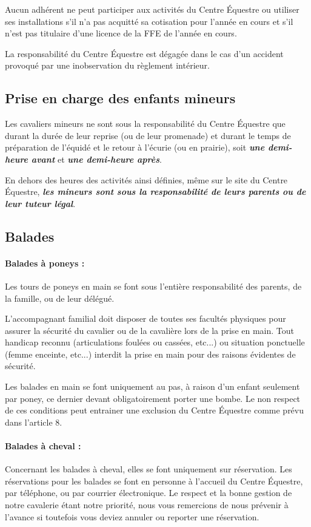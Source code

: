 \documentclass[11pt,a4paper]{article}
\begin{document}
Aucun adhérent ne peut participer aux activités du Centre Équestre ou utiliser ses installations s'il n'a pas acquitté sa cotisation pour l'année en cours et s'il n'est pas titulaire d'une licence de la FFE de l'année en cours.

La responsabilité du Centre Équestre est dégagée dans le cas d'un accident provoqué par une inobservation du règlement intérieur.

\subsection{Prise en charge des enfants mineurs}
Les cavaliers mineurs ne sont sous la responsabilité du Centre Équestre que durant la durée de leur reprise (ou de leur promenade) et durant le temps de préparation de l'équidé et le retour à l'écurie (ou en prairie), soit \textit{\textbf{une demi-heure avant}} et \textit{\textbf{une demi-heure après}}.

En dehors des heures des activités ainsi définies, même sur le site du Centre Équestre, \textit{\textbf{les mineurs sont sous la responsabilité de leurs parents ou de leur tuteur légal}}.

\subsection{Balades}

\paragraph{Balades à poneys :\\}
Les tours de poneys en main se font sous l'entière responsabilité des parents, de la famille, ou de leur délégué. \par
L'accompagnant familial doit disposer de toutes ses facultés physiques pour assurer la sécurité du cavalier ou de la cavalière lors de la prise en main. Tout handicap reconnu (articulations foulées ou cassées, etc...) ou situation ponctuelle (femme enceinte, etc...) interdit la prise en main pour des raisons évidentes de sécurité.

Les balades en main se font uniquement au pas, à raison d'un enfant seulement par poney, ce dernier devant obligatoirement porter une bombe. Le non respect de ces conditions peut entrainer une exclusion du Centre Équestre comme prévu dans l'article 8.

\paragraph{Balades à cheval :\\}
Concernant les balades à cheval, elles se font uniquement sur réservation. Les réservations pour les balades se font en personne à l'accueil du Centre Équestre, par téléphone, ou par courrier électronique. Le respect et la bonne gestion de notre cavalerie étant notre priorité, nous vous remercions de nous prévenir à l'avance si toutefois vous deviez annuler ou reporter une réservation.
\end{document}
